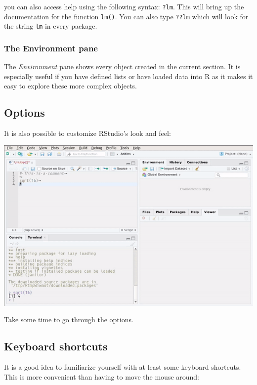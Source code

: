 \documentclass[]{gitbook}
\theoremstyle{definition}
\theoremstyle{definition}
\theoremstyle{definition}
\theoremstyle{remark}
\begin{document}
you can also access help using the following syntax: \texttt{?lm}. This
will bring up the documentation for the function \texttt{lm()}. You can
also type \texttt{??lm} which will look for the string \texttt{lm} in
every package.

\hypertarget{the-environment-pane}{%
\subsubsection{The Environment pane}\label{the-environment-pane}}

The \emph{Environment} pane shows every object created in the current
section. It is especially useful if you have defined lists or have
loaded data into R as it makes it easy to explore these more complex
objects.

\hypertarget{options}{%
\subsection{Options}\label{options}}

It is also possible to customize RStudio's look and feel:

\includegraphics{pics/rstudio_options.gif}

Take some time to go through the options.

\hypertarget{keyboard-shortcuts}{%
\subsection{Keyboard shortcuts}\label{keyboard-shortcuts}}

It is a good idea to familiarize yourself with at least some keyboard
shortcuts. This is more convenient than having to move the mouse around:
\end{document}
